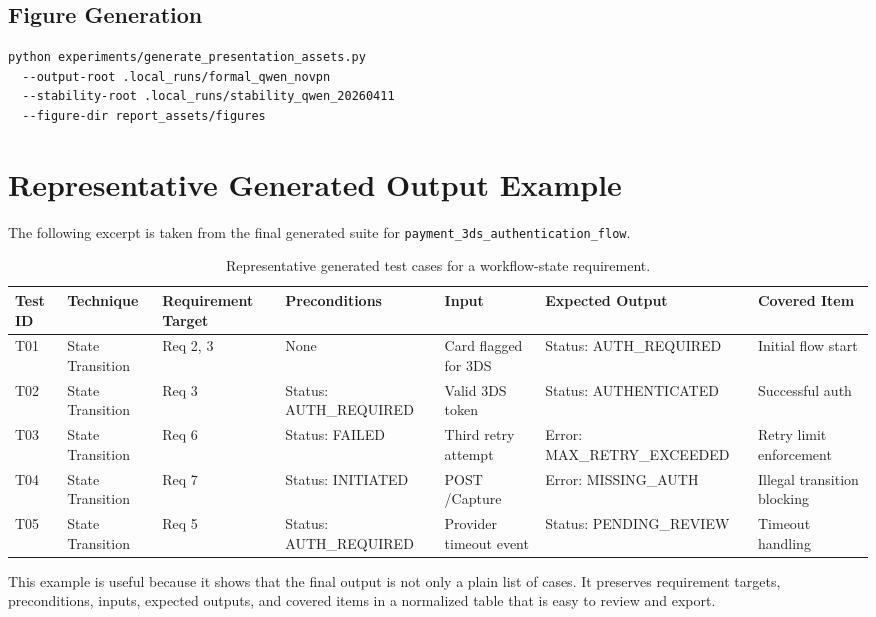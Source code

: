 \documentclass{article}
\begin{document}
\subsection{Figure Generation}
\begin{verbatim}
python experiments/generate_presentation_assets.py
  --output-root .local_runs/formal_qwen_novpn
  --stability-root .local_runs/stability_qwen_20260411
  --figure-dir report_assets/figures
\end{verbatim}

\section{Representative Generated Output Example}
The following excerpt is taken from the final generated suite for \texttt{payment\_3ds\_authentication\_flow}.

\begin{table}[h]
\centering
\scriptsize
\begin{tabular}{p{} p{} p{} p{} p{} p{} p{}}
\toprule
\textbf{Test ID} & \textbf{Technique} & \textbf{Requirement Target} & \textbf{Preconditions} & \textbf{Input} & \textbf{Expected Output} & \textbf{Covered Item} \\
\midrule
T01 & State Transition & Req 2, 3 & None & Card flagged for 3DS & Status: AUTH\_REQUIRED & Initial flow start \\
T02 & State Transition & Req 3 & Status: AUTH\_REQUIRED & Valid 3DS token & Status: AUTHENTICATED & Successful auth \\
T03 & State Transition & Req 6 & Status: FAILED & Third retry attempt & Error: MAX\_RETRY\_EXCEEDED & Retry limit enforcement \\
T04 & State Transition & Req 7 & Status: INITIATED & POST /Capture & Error: MISSING\_AUTH & Illegal transition blocking \\
T05 & State Transition & Req 5 & Status: AUTH\_REQUIRED & Provider timeout event & Status: PENDING\_REVIEW & Timeout handling \\
\bottomrule
\end{tabular}
\caption{Representative generated test cases for a workflow-state requirement.}
\label{tab:outputexample}
\end{table}

This example is useful because it shows that the final output is not only a plain list of cases. It preserves requirement targets, preconditions, inputs, expected outputs, and covered items in a normalized table that is easy to review and export.
\end{document}
